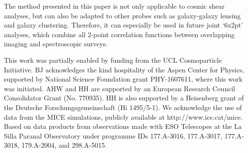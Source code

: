 \documentclass{aa}
\begin{document}
The method presented in this paper is not only applicable to cosmic shear analyses, but can also be adapted to other probes such as galaxy-galaxy lensing and galaxy clustering. Therefore, it can especially be used in future joint `6x2pt' analyses, which combine all 2-point correlation functions between overlapping imaging and spectroscopic surveys.
\begin{acknowledgements}
This work was partially enabled by funding from the UCL Cosmoparticle Initiative.
BJ acknowledges the kind hospitality of the Aspen Center for Physics, supported by National Science Foundation grant PHY-1607611, where this work was initiated.
AHW and HH are supported by an European Research Council Consolidator Grant (No. 770935).
HH is also supported by a Heisenberg grant of the Deutsche Forschungsgemeinschaft (Hi 1495/5-1). 
We acknowledge the use of data from the MICE simulations, publicly available at http://www.ice.cat/mice.
Based on data products from observations made with ESO Telescopes at the La Silla Paranal Observatory under programme IDs 177.A-3016, 177.A-3017, 177.A-3018, 179.A-2004, and 298.A-5015.
\end{acknowledgements}




\end{document}
